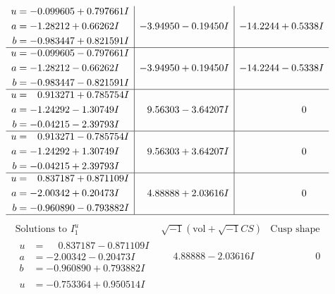 \documentclass[1p]{elsarticle_modified}
\theoremstyle{definition}
\newcommand{\I}{\sqrt{-1}}
\begin{document}
$$\begin{array}{c|c|c}
\begin{aligned}
u &= -0.099605 + 0.797661 I \\
a &= -1.28212 + 0.66262 I \\
b &= -0.983447 + 0.821591 I\end{aligned}
 & -3.94950 - 0.19450 I & -14.2244 + 0.5338 I \\ \hline\begin{aligned}
u &= -0.099605 - 0.797661 I \\
a &= -1.28212 - 0.66262 I \\
b &= -0.983447 - 0.821591 I\end{aligned}
 & -3.94950 + 0.19450 I & -14.2244 - 0.5338 I \\ \hline\begin{aligned}
u &= \phantom{-}0.913271 + 0.785754 I \\
a &= -1.24292 - 1.30749 I \\
b &= -0.04215 - 2.39793 I\end{aligned}
 & \phantom{-}9.56303 - 3.64207 I & \phantom{-0.000000 } 0 \\ \hline\begin{aligned}
u &= \phantom{-}0.913271 - 0.785754 I \\
a &= -1.24292 + 1.30749 I \\
b &= -0.04215 + 2.39793 I\end{aligned}
 & \phantom{-}9.56303 + 3.64207 I & \phantom{-0.000000 } 0 \\ \hline\begin{aligned}
u &= \phantom{-}0.837187 + 0.871109 I \\
a &= -2.00342 + 0.20473 I \\
b &= -0.960890 - 0.793882 I\end{aligned}
 & \phantom{-}4.88888 + 2.03616 I & \phantom{-0.000000 } 0\\
 \hline 
 \end{array}$$\newpage$$\begin{array}{c|c|c}  
\text{Solutions to }I^u_{1}& \I (\text{vol} + \sqrt{-1}CS) & \text{Cusp shape}\\
 \hline 
\begin{aligned}
u &= \phantom{-}0.837187 - 0.871109 I \\
a &= -2.00342 - 0.20473 I \\
b &= -0.960890 + 0.793882 I\end{aligned}
 & \phantom{-}4.88888 - 2.03616 I & \phantom{-0.000000 } 0 \\ \hline\begin{aligned}
u &= -0.753364 + 0.950514 I \\

\end{aligned}
\end{array}$$
\end{document}
